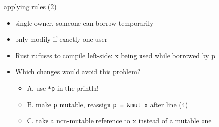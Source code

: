 \begin{frame}[fragile,label=noDangleApply2Exer]{applying rules (2)}
\begin{itemize}
\item single owner, someone can borrow temporarily
\item only modify if exactly one user
\end{itemize}
\begin{itemize}
\item Rust rufuses to compile left-side: x being used while borrowed by p
\item Which changes would avoid this problem?
    \begin{itemize}
    \item A. use \texttt{*p} in the println!
    \item B. make \texttt{p} mutable, reassign \lstinline|p = &mut x| after line (4)
    \item C. take a non-mutable reference to x instead of a mutable one
    \end{itemize}
\end{itemize}
\end{frame}
